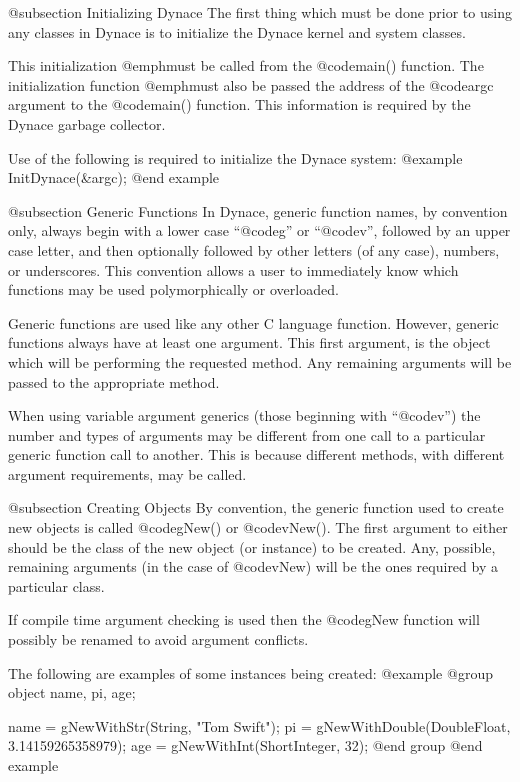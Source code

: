 @subsection Initializing Dynace
The first thing which must be done prior to using any classes in Dynace is
to initialize the Dynace kernel and system classes.

This initialization @emph{must} be called from the @code{main()}
function.  The initialization function @emph{must} also be passed the
address of the @code{argc} argument to the @code{main()} function.  This
information is required by the Dynace garbage collector.

Use of the following is required to initialize the Dynace system:
@example
        InitDynace(&argc);
@end example


@subsection Generic Functions
In Dynace, generic function names, by convention only, always begin with
a lower case ``@code{g}'' or ``@code{v}'', followed by an upper case
letter, and then optionally followed by other letters (of any case),
numbers, or underscores.  This convention allows a user to immediately
know which functions may be used polymorphically or overloaded.

Generic functions are used like any other C language function.  However,
generic functions always have at least one argument.  This first argument,
is the object which will be performing the requested method.  Any remaining
arguments will be passed to the appropriate method.

When using variable argument generics (those beginning with
``@code{v}'') the number and types of arguments may be different from
one call to a particular generic function call to another.  This is
because different methods, with different argument requirements, may be
called.

@subsection Creating Objects
By convention, the generic function used to create new objects is called
@code{gNew()} or @code{vNew()}.  The first argument to either should be
the class of the new object (or instance) to be created.  Any, possible,
remaining arguments (in the case of @code{vNew}) will be the ones
required by a particular class.

If compile time argument checking is used then the @code{gNew} function
will possibly be renamed to avoid argument conflicts.

The following are examples of some instances being created:
@example
@group
        object   name, pi, age;

        name = gNewWithStr(String, "Tom Swift");
        pi   = gNewWithDouble(DoubleFloat, 3.14159265358979);
        age  = gNewWithInt(ShortInteger, 32);
@end group
@end example

